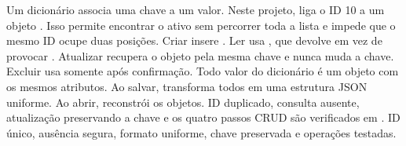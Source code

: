 
 Um dicionário associa uma chave a um valor. Neste projeto,  liga o ID 10 a um objeto . Isso permite encontrar o ativo sem percorrer toda a lista e impede que o mesmo ID ocupe duas posições.
 Criar insere . Ler usa , que devolve  em vez de provocar . Atualizar recupera o objeto pela mesma chave e nunca muda a chave. Excluir usa  somente após confirmação.
 Todo valor do dicionário é um objeto  com os mesmos atributos. Ao salvar,  transforma todos em uma estrutura JSON uniforme. Ao abrir,  reconstrói os objetos.
 ID duplicado, consulta ausente, atualização preservando a chave e os quatro passos CRUD são verificados em .
 ID único, ausência segura, formato uniforme, chave preservada e operações testadas.

